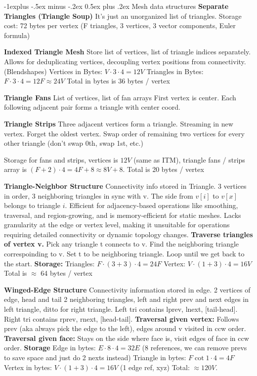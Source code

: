 \documentclass[letterpaper, 8pt]{extarticle}
\makeatletter
\renewcommand{\subsection}{\@startsection{subsection}{2}{0mm}%
                                {-1explus -.5ex minus -.2ex}%
                                {0.5ex plus .2ex}%
                                {\normalfont\tiny\bfseries}}
\makeatother
\begin{document}
\begin{multicols*}{4}
    \subsection{Mesh data structures}
    \textbf{Separate Triangles (Triangle Soup)}
    It's just an unorganized list of triangles.
    Storage cost: 72 bytes per vertex
    (F triangles, 3 vertices, 3 vector components, Euler formula)

    \textbf{Indexed Triangle Mesh}
    Store list of vertices, list of triangle indices separately.
    Allows for deduplicating vertices, decoupling vertex positions from connectivity. (Blendshapes)
    Vertices in Bytes: $V \cdot 3 \cdot 4 = 12 V$
    Triangles in Bytes: $F \cdot 3 \cdot 4 = 12 F \approx 24 V$
    Total in bytes is 36 bytes / vertex

    \textbf{Triangle Fans}
    List of vertices, list of fan arrays
    First vertex is center. Each following adjacent pair forms a triangle with center coord.

    \textbf{Triangle Strips}
    Three adjacent vertices form a triangle.
    Streaming in new vertex.
    Forget the oldest vertex.
    Swap order of remaining two vertices for every other triangle (don't swap 0th, swap 1st, etc.)

    Storage for fans and strips, vertices is $12 V$ (same as ITM),
    triangle fans / strips array is $(F + 2) \cdot 4 = 4F + 8 \approx 8V + 8$.
    Total is 20 bytes / vertex

    \textbf{Triangle-Neighbor Structure}
    Connectivity info stored in Triangle.
    3 vertices in order, 3 neighboring triangles in sync with v.
    The side from $v[i]$ to $v[x]$ belongs to triangle $i$.
    Efficient for adjacency-based operations like smoothing, traversal, and region-growing,
    and is memory-efficient for static meshes.
    Lacks granularity at the edge or vertex level,
    making it unsuitable for operations requiring detailed connectivity or dynamic topology changes.
    \textbf{Traverse triangles of vertex v.}
    Pick any triangle t connects to v.
    Find the neighboring triangle correspoinding to v.
    Set t to be neighboring triangle.
    Loop until we get back to the start.
    \textbf{Storage:}
    Triangles: $F \cdot (3 + 3) \cdot 4 = 24F$
    Vertex: $V \cdot (1 + 3) \cdot 4 = 16V$
    Total is $\approx$ 64 bytes / vertex

    \textbf{Winged-Edge Structure}
    Connectivity information stored in edge.
    2 vertices of edge, head and tail
    2 neighboring triangles, left and right
    prev and next edges in left triangle,
    ditto for right triangle.
    Left tri contains lprev, lnext, [tail-head].
    Right tri contains rprev, rnext, [head-tail].
    \textbf{Traversal given vertex:}
    Follows prev (aka always pick the edge to the left),
    edges around v visited in ccw order.
    \textbf{Traversal given face:}
    Stays on the side where face is,
    visit edges of face in ccw order.
    \textbf{Storage}
    Edge in bytes: $E \cdot 8 \cdot 4 = 32E$ (8 references, we can remove prevs to save space and just do 2 nexts instead)
    Triangle in bytes: $F \cot 1 \cdot 4 = 4F$
    Vertex in bytes: $V \cdot (1 + 3) \cdot 4 = 16V$ (1 edge ref, xyz)
    Total: $\approx 120V$.


\end{multicols*}
\end{document}
